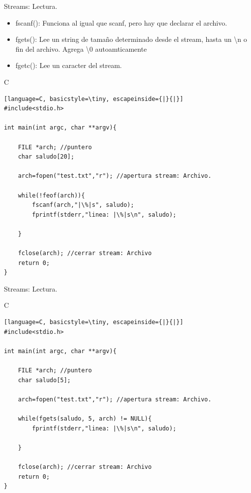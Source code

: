 \documentclass{beamer}
\begin{document}
\begin{frame}[fragile]{Streams: Lectura.}
\begin{itemize}
	\item fscanf(): Funciona al igual que scanf, pero hay que declarar el archivo.
	\item fgets(): Lee un string de tamaño determinado desde el stream, hasta un \textbackslash n o fin del archivo. Agrega \textbackslash 0 autoamticamente
	\item fgetc(): Lee un caracter del stream.
	\end{itemize}
\begin{exampleblock}{C}
\begin{lstlisting}[language=C, basicstyle=\tiny, escapeinside={|}{|}]
#include<stdio.h>

int main(int argc, char **argv){

	FILE *arch; //puntero
	char saludo[20];

	arch=fopen("test.txt","r"); //apertura stream: Archivo.

	while(!feof(arch)){
		fscanf(arch,"|\%|s", saludo);
		fprintf(stderr,"linea: |\%|s\n", saludo);

	}

	fclose(arch); //cerrar stream: Archivo
	return 0;
}
\end{lstlisting}
\end{exampleblock}
\end{frame}

\begin{frame}[fragile]{Streams: Lectura.}
\begin{exampleblock}{C}
\begin{lstlisting}[language=C, basicstyle=\tiny, escapeinside={|}{|}]
#include<stdio.h>

int main(int argc, char **argv){

	FILE *arch; //puntero
	char saludo[5];

	arch=fopen("test.txt","r"); //apertura stream: Archivo.

	while(fgets(saludo, 5, arch) != NULL){
		fprintf(stderr,"linea: |\%|s\n", saludo);

	}

	fclose(arch); //cerrar stream: Archivo
	return 0;
}
\end{lstlisting}
\end{exampleblock}
\end{frame}
\end{document}
